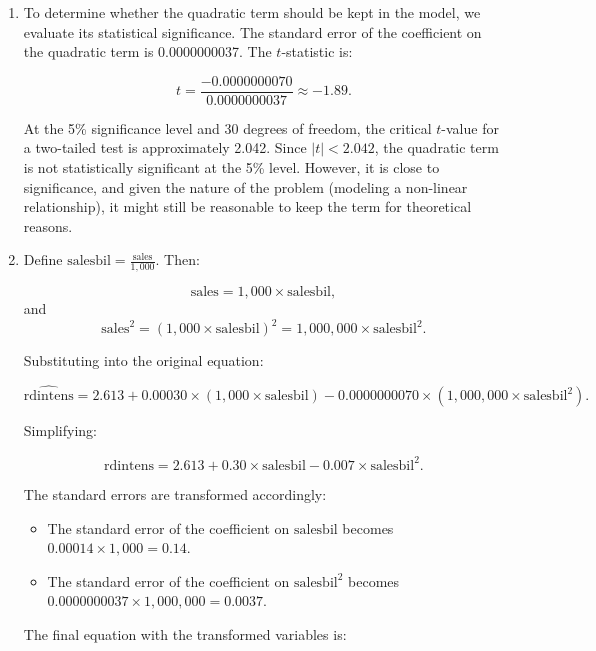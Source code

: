 \documentclass[12pt]{article}
\begin{document}
\begin{enumerate}
{\begin{enumerate}
\[
\text{sales} = \frac{0.00030}{2 \times 0.0000000070} = \frac{0.00030}{0.000000014} = 21,428.57 \text{ million dollars}.
\]

So, the marginal effect becomes negative when sales exceed 21,428.57 million dollars (or approximately 21.4 billion dollars).

\item To determine whether the quadratic term should be kept in the model, we evaluate its statistical significance. The standard error of the coefficient on the quadratic term is 0.0000000037. The \( t \)-statistic is:

\[
t = \frac{-0.0000000070}{0.0000000037} \approx -1.89.
\]

At the 5\% significance level and 30 degrees of freedom, the critical \( t \)-value for a two-tailed test is approximately 2.042. Since \( |t| < 2.042 \), the quadratic term is not statistically significant at the 5\% level. However, it is close to significance, and given the nature of the problem (modeling a non-linear relationship), it might still be reasonable to keep the term for theoretical reasons.

\item Define \( \text{salesbil} = \frac{\text{sales}}{1,000} \). Then:

\[
\text{sales} = 1,000 \times \text{salesbil},
\]
and
\[
\text{sales}^2 = (1,000 \times \text{salesbil})^2 = 1,000,000 \times \text{salesbil}^2.
\]

Substituting into the original equation:

\[
\widehat{\text{rdintens}} = 2.613 + 0.00030 \times (1,000 \times \text{salesbil}) - 0.0000000070 \times (1,000,000 \times \text{salesbil}^2).
\]

Simplifying:

\[
\widehat{\text{rdintens}} = 2.613 + 0.30 \times \text{salesbil} - 0.007 \times \text{salesbil}^2.
\]

The standard errors are transformed accordingly:
\begin{itemize}
    \item The standard error of the coefficient on \( \text{salesbil} \) becomes \( 0.00014 \times 1,000 = 0.14 \).
\item The standard error of the coefficient on \( \text{salesbil}^2 \) becomes \( 0.0000000037 \times 1,000,000 = 0.0037 \).
\end{itemize}


The final equation with the transformed variables is:


\end{enumerate}}
\end{enumerate}
\end{document}
